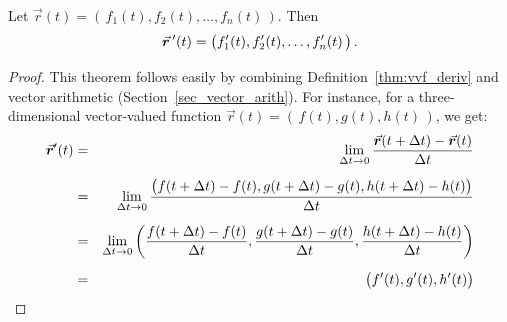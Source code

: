 \ifanalysis

\begin{theorem}\label{thm:vvf_deriv}
Let $\vec r(t) = \left( \, f_1(t),f_2(t),\ldots, f_n(t)\,\right)$. Then 
	$$\vrp(t) = \left( f_1'(t),f_2'(t),\ldots, f_n'(t)\, \right).$$
\end{theorem}


\begin{proof}

This theorem follows easily by combining Definition~\ref{thm:vvf_deriv} and vector arithmetic (Section~\ref{sec_vector_arith}). For instance, for a three-dimensional vector-valued function $\vec r(t) = \left( \, f(t), g(t), h(t)\,\right)$, we get: 
\begin{eqnarray*}
  {\vec r}'(t)&=&\lim_{\Delta t\to0}{{\vec r}(t+\Delta t)-{\vec r}(t)\over
  \Delta t}\\[0.2cm]
  &=&\lim_{\Delta t\to0}{\left( f(t+\Delta t)-f(t),g(t+\Delta t)-g(t),
  h(t+\Delta t)-h(t)\right)\over \Delta t}\\[0.2cm]
  &=&\lim_{\Delta t\to0}\left(  {f(t+\Delta t)-f(t)\over\Delta t},
  {g(t+\Delta t)-g(t)\over\Delta t},
  {h(t+\Delta t)-h(t)\over \Delta t}\right)\\[0.2cm]
  &=&\left(  f'(t),g'(t),h'(t)\right)
\end{eqnarray*}


\end{proof}

\fi


